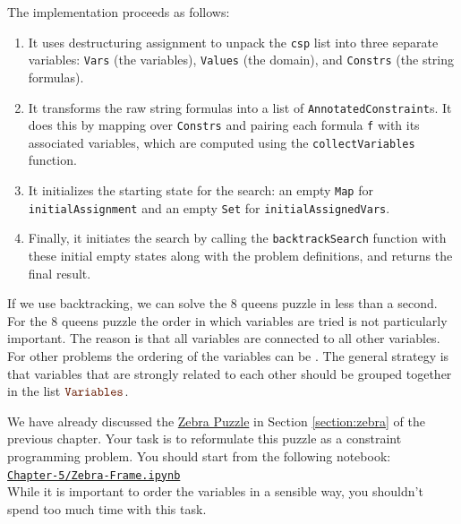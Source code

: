 \begin{enumerate}
  The implementation proceeds as follows:
  \begin{enumerate}
  \item It uses destructuring assignment to unpack the \texttt{csp} list into three separate variables:
    \texttt{Vars} (the variables), \texttt{Values} (the domain), and \texttt{Constrs} (the string formulas). 
  \item It transforms the raw string formulas into a list of \texttt{AnnotatedConstraint}s. It does this by
    mapping over \texttt{Constrs} and pairing each formula \texttt{f} with its associated variables, which are
    computed using the \texttt{collectVariables} function. 
  \item It initializes the starting state for the search: an empty \texttt{Map} for \texttt{initialAssignment}
    and an empty \texttt{Set} for \texttt{initialAssignedVars}. 
  \item Finally, it initiates the search by calling the \texttt{backtrackSearch} function with these initial
    empty states along with the problem definitions, and returns the final result. 
  \end{enumerate}
\end{enumerate}

If we use backtracking, we can solve the 8 queens puzzle in less than a second.
For the 8 queens puzzle the order in which variables are tried is not particularly important.  The reason
is that all variables are connected to all other variables.  For other problems the ordering of the variables
can be .  The general strategy is that variables that are strongly related to each other should
be grouped together in the list $\mytt{Variables}$.

\exerciseEng
We have already discussed the \href{https://en.wikipedia.org/wiki/Zebra_puzzle}{Zebra Puzzle} in Section
\ref{section:zebra} of the previous chapter.  Your task is to reformulate this puzzle as a constraint
programming problem.  You should start from the following notebook:
\\[0.2cm]
\hspace*{1.3cm}
\href{https://github.com/karlstroetmann/Logic/blob/master/TypeScript/Chapter-5/Zebra-Frame.ipynb}{\texttt{Chapter-5/Zebra-Frame.ipynb}}
\\[0.2cm]
While it is important to order the variables in a sensible way, you shouldn't spend too much time with this
task.
\eox

